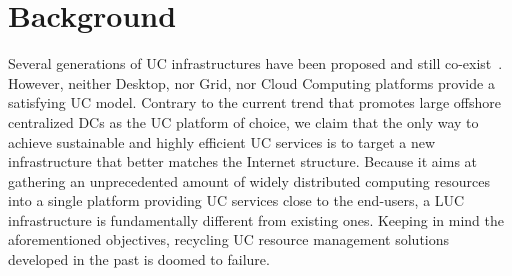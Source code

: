 \section{Background\label{sec:background}}

Several generations of UC infrastructures have been proposed and still
co-exist~\cite{foster:2011}. However, neither Desktop, nor Grid, nor Cloud Computing
platforms provide a satisfying UC model.  Contrary to the current trend that promotes
large offshore centralized DCs as the UC platform of choice, we claim that the only way to
achieve sustainable and highly efficient UC services is to target a new infrastructure
that better matches the Internet structure.  Because it aims at gathering an unprecedented
amount of widely distributed computing resources into a single platform providing UC
services close to the end-users, a LUC infrastructure is fundamentally different from
existing ones.  Keeping in mind the aforementioned objectives, recycling UC resource
management solutions developed in the past is doomed to failure.

